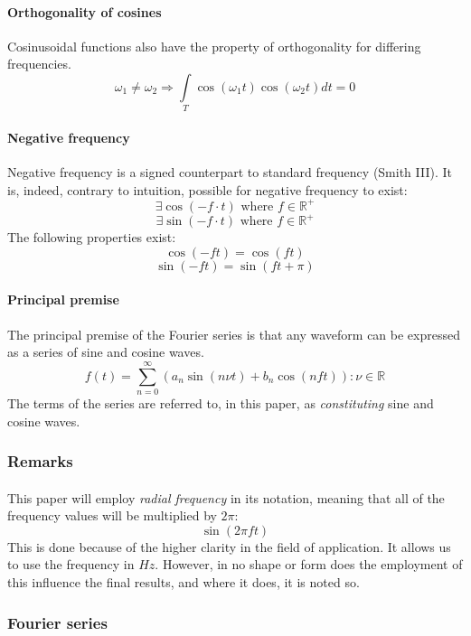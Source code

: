 \documentclass{article}
\begin{document}
\paragraph{Orthogonality of cosines}
Cosinusoidal functions also have the property of orthogonality for differing
frequencies.
$$\omega_1 \neq \omega_2 \Rightarrow \int\limits_T \cos (\omega_1 t) \cos(\omega_2 t)
dt = 0$$

\paragraph*{Negative frequency}
Negative frequency is a signed counterpart to standard frequency (Smith III).
It is, indeed, contrary to intuition, possible for negative frequency to exist:
$$\exists \cos (-f \cdot t)\text{ where }f \in \mathbb{R}^{+}$$
$$\exists \sin (-f \cdot t)\text{ where }f \in \mathbb{R}^{+}$$
The following properties exist:
$$\cos (-f t) = \cos(f t)$$
$$\sin (-f t) = \sin \left( f t + \pi \right)$$

\paragraph*{Principal premise}
The principal premise of the Fourier series is that any waveform can be
expressed as a series of sine and cosine waves.
$$f(t) = \sum_{n = 0}^{\infty} (a_n \sin(n \nu t) + b_n \cos(n f t)) : \nu \in
\mathbb{R}$$
The terms of the series are referred to, in this paper, as
\textit{constituting} sine and cosine waves.

\subsubsection{Remarks}

\paragraph*{}
This paper will employ \textit{radial frequency} in its notation, meaning that
all of the frequency values will be multiplied by $2 \pi$:
$$\sin ( 2 \pi f t)$$
This is done because of the higher clarity in the field of application. It
allows us to use the frequency in $Hz$.  However, in no shape or form does the
employment of this influence the final results, and where it does, it is noted
so.

\subsubsection{Fourier series}
\end{document}
